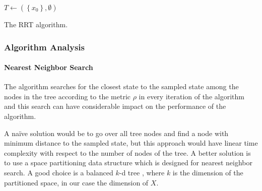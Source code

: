 \begin{algorithm}
	\SetAlgoLined
	\DontPrintSemicolon
	
	
	
	$T\gets \left(\left\{x_0\right\}, \emptyset\right)$\;
	
	
	\;
	
	\caption{The RRT algorithm.}
	\label{alg:rrt}
\end{algorithm}

\subsubsection{Algorithm Analysis}

\paragraph{Nearest Neighbor Search}

The algorithm searches for the closest state to the sampled state among the nodes in the tree according to the metric $\rho$ in every iteration of the algorithm and this search can have considerable impact on the performance of the algorithm.

A naïve solution would be to go over all tree nodes and find a node with minimum distance to the sampled state, but this approach would have linear time complexity with respect to the number of nodes of the tree. A better solution is to use a space partitioning data structure which is designed for nearest neighbor search. A good choice is a balanced $k$-d tree \cite{kd-tree}, where $k$ is the dimension of the partitioned space, in our case the dimension of $X$.

